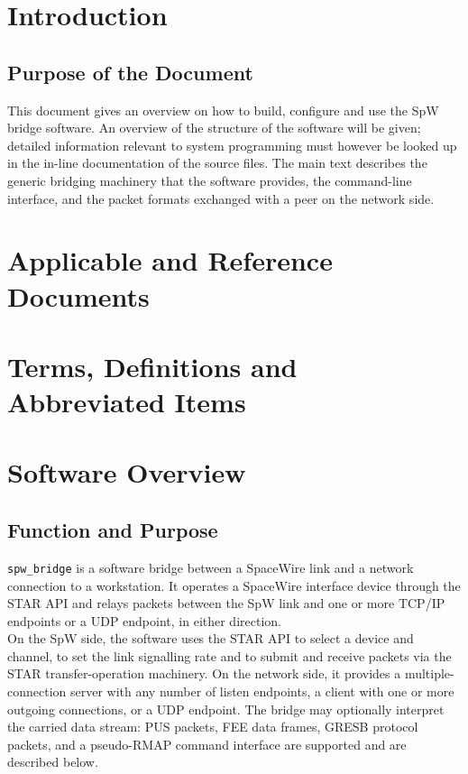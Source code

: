 \chapter{Introduction}

\section{Purpose of the Document}

This document gives an overview on how to build, configure and use the
\gls{SpW} bridge software. An overview of the structure of the software will be
given; detailed information relevant to system programming must however be
looked up in the in-line documentation of the source files. The main text
describes the generic bridging machinery that the software provides, the
command-line interface, and the packet formats exchanged with a peer on the
network side.

\chapter{Applicable and Reference Documents}
\label{cha:appdoc}

\printbibliography[heading=none]


\chapter{Terms, Definitions and Abbreviated Items}
\printglossary[type=acronym]
\printglossary[type=main, style=altlist]



\chapter{Software Overview}

\section{Function and Purpose}

\texttt{spw\_bridge} is a software bridge between a \gls{SpaceWire} link and a
network connection to a workstation. It operates a \gls{SpaceWire} interface
device through the \gls{STAR} API and relays packets between the \gls{SpW}
link and one or more \gls{TCP}/IP endpoints or a \gls{UDP} endpoint, in either
direction.
\\

On the \gls{SpW} side, the software uses the STAR API to select a device and
channel, to set the link signalling rate and to submit and receive packets via
the STAR transfer-operation machinery. On the network side, it provides a
multiple-connection server with any number of listen endpoints, a client with
one or more outgoing connections, or a UDP endpoint. The
bridge may optionally interpret the carried data stream: \gls{PUS} packets,
\gls{FEE} data frames, GRESB protocol packets, and a pseudo-\gls{RMAP} command
interface are supported and are described below.
\\

